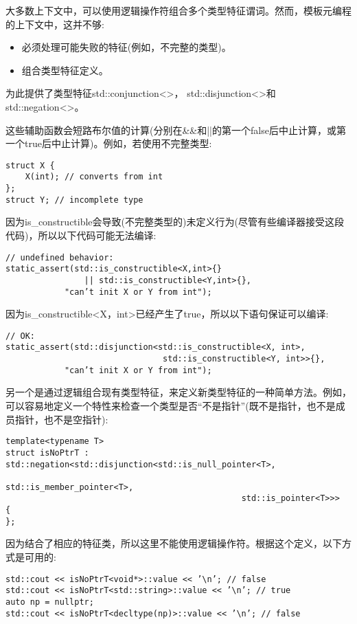 
大多数上下文中，可以使用逻辑操作符组合多个类型特征谓词。然而，模板元编程的上下文中，这并不够:

\begin{itemize}
\item 
必须处理可能失败的特征(例如，不完整的类型)。

\item 
组合类型特征定义。
\end{itemize}

为此提供了类型特征std::conjunction<>， std::disjunction<>和std::negation<>。

这些辅助函数会短路布尔值的计算(分别在\&\&和||的第一个false后中止计算，或第一个true后中止计算)。例如，若使用不完整类型:

\begin{lstlisting}[style=styleCXX]
struct X {
	X(int); // converts from int
};
struct Y; // incomplete type
\end{lstlisting}

因为is\_constructible会导致(不完整类型的)未定义行为(尽管有些编译器接受这段代码)，所以以下代码可能无法编译:

\begin{lstlisting}[style=styleCXX]
// undefined behavior:
static_assert(std::is_constructible<X,int>{}
				|| std::is_constructible<Y,int>{},
			"can’t init X or Y from int");
\end{lstlisting}

因为is\_constructible<X，int>已经产生了true，所以以下语句保证可以编译:

\begin{lstlisting}[style=styleCXX]
// OK:
static_assert(std::disjunction<std::is_constructible<X, int>,
								std::is_constructible<Y, int>>{},
			"can’t init X or Y from int");
\end{lstlisting}

另一个是通过逻辑组合现有类型特征，来定义新类型特征的一种简单方法。例如，可以容易地定义一个特性来检查一个类型是否“不是指针”(既不是指针，也不是成员指针，也不是空指针):

\begin{lstlisting}[style=styleCXX]
template<typename T>
struct isNoPtrT : std::negation<std::disjunction<std::is_null_pointer<T>,
												std::is_member_pointer<T>,
												std::is_pointer<T>>>
{
};
\end{lstlisting}

因为结合了相应的特征类，所以这里不能使用逻辑操作符。根据这个定义，以下方式是可用的:

\begin{lstlisting}[style=styleCXX]
std::cout << isNoPtrT<void*>::value << ’\n’; // false
std::cout << isNoPtrT<std::string>::value << ’\n’; // true
auto np = nullptr;
std::cout << isNoPtrT<decltype(np)>::value << ’\n’; // false
\end{lstlisting}

